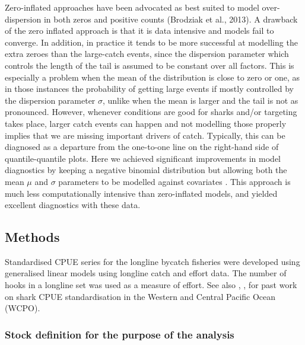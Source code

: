 Zero-inflated approaches have been advocated as best suited to model over-dispersion in both zeros and positive counts (Brodziak et al., 2013). A drawback of the zero inflated approach is that it is data intensive and models fail to converge. In addition, in practice it tends to be more successful at modelling the extra zeroes than the large-catch events, since the dispersion parameter which controls the length of the tail is assumed to be constant over all factors. This is especially a problem when the mean of the distribution is close to zero or one, as in those instances the probability of getting large events if mostly controlled by the dispersion parameter $\sigma$, unlike when the mean is larger and the tail is not as pronounced. However, whenever conditions are good for sharks and/or targeting takes place, larger catch events can happen and not modelling those properly implies that we are missing important drivers of catch. Typically, this can be diagnosed as a departure from the one-to-one line on the right-hand side of quantile-quantile plots. Here we achieved significant improvements in model diagnostics by keeping a negative binomial distribution but allowing both the mean $\mu$ and $\sigma$ parameters to be modelled against covariates \citep{Rigby2005_a}. This approach is much less computationally intensive than zero-inflated models, and yielded excellent diagnostics with these data.


 \subsection{Methods}
Standardised CPUE series for the longline bycatch fisheries were developed using generalised linear models using longline catch and effort data. The number of hooks in a longline set was used as a measure of effort.
See also \citet{Clarke2011_a, Clarke2011_b},  \citet{Walsh2011_a}, \citet{Rice2012_a}   for past work on shark CPUE standardisation in the Western and Central Pacific Ocean (WCPO).
 \label{cpuemeth:datafilter}
 \subsubsection{Stock definition for the purpose of the analysis}
   
